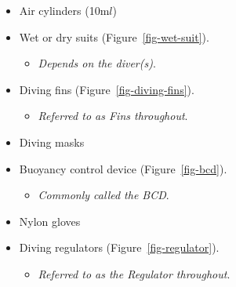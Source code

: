 \documentclass[
  letterpaper,
  DIV=11,
  numbers=noendperiod]{scrreprt}
\providecommand{\tightlist}{%
  \setlength{\itemsep}{0pt}\setlength{\parskip}{0pt}}\usepackage{longtable,booktabs,array}
\begin{document}
\begin{itemize}
\tightlist
\item
  Air cylinders (10m\(l\))
\item
  Wet or dry suits (Figure~\ref{fig-wet-suit}).

  \begin{itemize}
  \tightlist
  \item
    \emph{Depends on the diver(s)}.
  \end{itemize}
\item
  Diving fins (Figure~\ref{fig-diving-fins}).

  \begin{itemize}
  \tightlist
  \item
    \emph{Referred to as Fins throughout}.
  \end{itemize}
\item
  Diving masks
\item
  Buoyancy control device (Figure~\ref{fig-bcd}).

  \begin{itemize}
  \tightlist
  \item
    \emph{Commonly called the BCD}.
  \end{itemize}
\item
  Nylon gloves
\item
  Diving regulators (Figure~\ref{fig-regulator}).

  \begin{itemize}
  \tightlist
  \item
    \emph{Referred to as the Regulator throughout}.
  \end{itemize}
\end{itemize}
\end{document}
